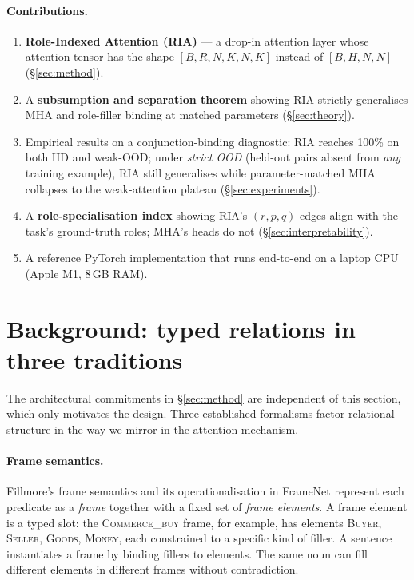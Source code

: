 \documentclass{article}
\begin{document}
\paragraph{Contributions.}
\begin{enumerate}
    \item \textbf{Role-Indexed Attention (RIA)} --- a drop-in attention
      layer whose attention tensor has the shape
      $[B, R, N, K, N, K]$ instead of $[B, H, N, N]$ (\S\ref{sec:method}).
    \item A \textbf{subsumption and separation theorem} showing RIA
      strictly generalises MHA and role-filler binding at matched
      parameters (\S\ref{sec:theory}).
    \item Empirical results on a conjunction-binding diagnostic:
      RIA reaches 100\% on both IID and weak-OOD; under \emph{strict
      OOD} (held-out pairs absent from \emph{any} training example),
      RIA still generalises while parameter-matched MHA collapses to
      the weak-attention plateau (\S\ref{sec:experiments}).
    \item A \textbf{role-specialisation index} showing RIA's
      $(r, p, q)$ edges align with the task's ground-truth roles; MHA's
      heads do not (\S\ref{sec:interpretability}).
    \item A reference PyTorch implementation that runs end-to-end on a
      laptop CPU (Apple M1, 8\,GB RAM).
\end{enumerate}

\section{Background: typed relations in three traditions}
\label{sec:background}

The architectural commitments in \S\ref{sec:method} are independent of
this section, which only motivates the design. Three established
formalisms factor relational structure in the way we mirror in the
attention mechanism.

\paragraph{Frame semantics.}
Fillmore's frame semantics \citep{fillmore1976,fillmore1982} and its
operationalisation in FrameNet \citep{baker1998framenet} represent
each predicate as a \emph{frame} together with a fixed set of
\emph{frame elements}. A frame element is a typed slot: the
\textsc{Commerce\_buy} frame, for example, has elements
\textsc{Buyer}, \textsc{Seller}, \textsc{Goods}, \textsc{Money},
each constrained to a specific kind of filler. A sentence
instantiates a frame by binding fillers to elements. The same noun
can fill different elements in different frames without contradiction.
\end{document}
